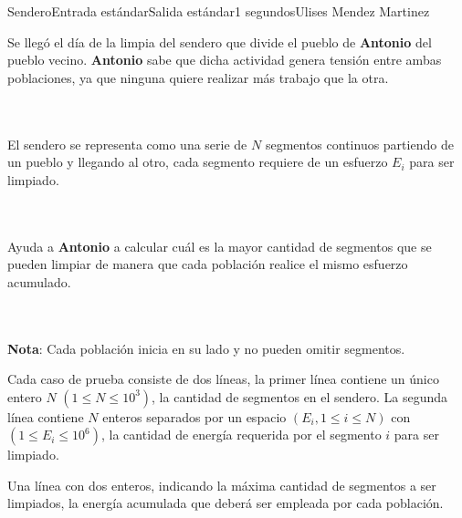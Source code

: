 \begin{problem}{Sendero}{Entrada estándar}{Salida estándar}{1 segundos}{}{Ulises Mendez Martinez}

Se llegó el día de la limpia del sendero que divide el pueblo de \textbf{Antonio} del pueblo vecino. \textbf{Antonio} sabe que dicha actividad genera tensión entre ambas poblaciones, ya que ninguna quiere realizar más trabajo que la otra.

\\ \\

El sendero se representa como una serie de $N$ segmentos continuos partiendo de un pueblo y llegando al otro, cada segmento requiere de un esfuerzo $E_i$ para ser limpiado.

\\ \\

Ayuda a \textbf{Antonio} a calcular cuál es la mayor cantidad de segmentos que se pueden limpiar de manera que cada población realice el mismo esfuerzo acumulado.

\\ \\

\textbf{Nota}: 
Cada población inicia en su lado y no pueden omitir segmentos.


\InputFile

Cada caso de prueba consiste de dos líneas, la primer línea contiene un único entero $N$ $(1 \le N \le 10^3)$, la cantidad de segmentos en el sendero. La segunda línea contiene $N$ enteros separados por un espacio $(E_i, 1\le i \le N)$  con $(1 \le E_i \le 10^6)$, la cantidad de energía requerida por el segmento $i$ para ser limpiado.


\OutputFile

Una línea con dos enteros, indicando la máxima cantidad de segmentos a ser limpiados, la energía acumulada que deberá ser empleada por cada población.

\Example

\begin{example}
\end{example}





\end{problem}

